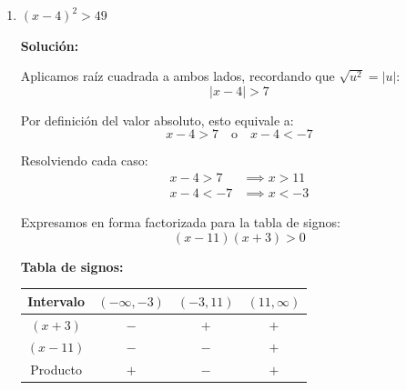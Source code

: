 \documentclass[12pt]{article}
\newcommand{\solucion}{%
    \vspace{0.8em}%
    \textbf{Solución:}%
}
\begin{document}
\begin{enumerate}[label=\alph*.-]
    Nota: Al dividir por $-19$ se invierte el sentido de la desigualdad.

    El conjunto solución es:
    \[
    \boxed{CS = \left(-\infty, \dfrac{21}{19}\right]}
    \]

    \textbf{Representación gráfica:}

    \begin{center}
    \end{center}

    \newpage

    \item $(x - 4)^2 > 49$

    \solucion

    Aplicamos raíz cuadrada a ambos lados, recordando que $\sqrt{u^2} = |u|$:
    \[
    |x - 4| > 7
    \]

    Por definición del valor absoluto, esto equivale a:
    \[
    x - 4 > 7 \quad \text{o} \quad x - 4 < -7
    \]

    Resolviendo cada caso:
    \begin{align*}
    x - 4 > 7  &\implies x > 11 \\[0.3em]
    x - 4 < -7 &\implies x < -3
    \end{align*}

    Expresamos en forma factorizada para la tabla de signos:
    \[
    (x - 11)(x + 3) > 0
    \]

    \textbf{Tabla de signos:}

    \begin{center}
    \begin{tabular}{|c|c|c|c|}
    \hline
    Intervalo & $(-\infty, -3)$ & $(-3, 11)$ & $(11, \infty)$ \\
    \hline
    $(x + 3)$ & $-$ & $+$ & $+$ \\
    \hline
    $(x - 11)$ & $-$ & $-$ & $+$ \\
    \hline
    Producto & $+$ & $-$ & $+$ \\
    \hline
    \end{tabular}
    \end{center}


\end{enumerate}
\end{document}
